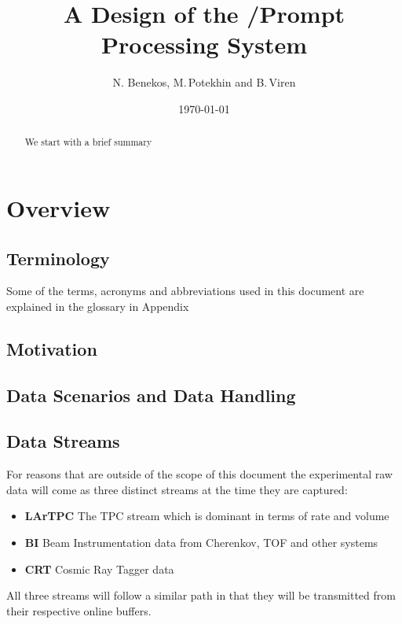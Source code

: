\documentclass[pdftex,12pt,letter]{article}
\title{A Design of the \pd/\expname Prompt Processing System}
\date{\today}
\author{N. Benekos, M.\,Potekhin and B.\,Viren}
\begin{document}
\maketitle

\begin{abstract}
\noindent  We start with a brief summary

\end{abstract}


\section{Overview}
\subsection{Terminology}
Some of the terms, acronyms and abbreviations used in this document are explained in the glossary in Appendix %

\subsection{Motivation}
\underlineDUNE

\subsection{Data Scenarios and Data Handling}
\label{sec:rawdata}

\subsection{Data Streams}
\label{sec:streams}

For reasons that are outside of the scope of this document  the experimental raw data
will come as three distinct streams at the time they are captured:
\begin{itemize}
\item \textbf{LArTPC} The TPC  stream which is dominant in terms of rate and volume
\item \textbf{BI} Beam Instrumentation data from Cherenkov, TOF and other systems
\item \textbf{CRT} Cosmic Ray Tagger data
\end{itemize}

\noindent All three streams will follow a similar path in that they will be transmitted from their respective
online buffers.
\end{document}
